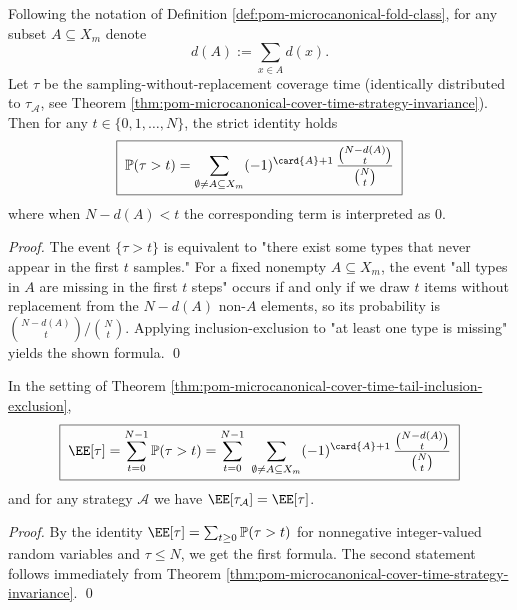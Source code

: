 \begin{theorem}\label{thm:pom-microcanonical-cover-time-tail-inclusion-exclusion}
Following the notation of Definition \ref{def:pom-microcanonical-fold-class}, for any subset \(A\subseteq X_m\) denote
\[
d(A):=\sum_{x\in A}d(x).
\]
Let \(\tau\) be the sampling-without-replacement coverage time (identically distributed to \(\tau_{\mathcal A}\), see Theorem \ref{thm:pom-microcanonical-cover-time-strategy-invariance}).
Then for any \(t\in\{0,1,\dots,N\}\), the strict identity holds
\[
\boxed{\;
\mathbb{P}(\tau>t)
=\sum_{\emptyset\neq A\subseteq X_m}(-1)^{\card{A}+1}\,
\frac{\binom{N-d(A)}{t}}{\binom{N}{t}}\;}
\]
where when \(N-d(A)<t\) the corresponding term is interpreted as \(0\).
\end{theorem}
\begin{proof}
The event \(\{\tau>t\}\) is equivalent to "there exist some types that never appear in the first \(t\) samples."
For a fixed nonempty \(A\subseteq X_m\), the event "all types in \(A\) are missing in the first \(t\) steps" occurs if and only if
we draw \(t\) items without replacement from the \(N-d(A)\) non-\(A\) elements, so its probability is \(\binom{N-d(A)}{t}/\binom{N}{t}\).
Applying inclusion-exclusion to "at least one type is missing" yields the shown formula. \qed
\end{proof}

\begin{corollary}\label{cor:pom-microcanonical-cover-time-mean}
In the setting of Theorem \ref{thm:pom-microcanonical-cover-time-tail-inclusion-exclusion},
\[
\boxed{\;
\EE[\tau]
=\sum_{t=0}^{N-1}\mathbb{P}(\tau>t)
=\sum_{t=0}^{N-1}\ \sum_{\emptyset\neq A\subseteq X_m}(-1)^{\card{A}+1}\,
\frac{\binom{N-d(A)}{t}}{\binom{N}{t}}\;}
\]
and for any strategy \(\mathcal A\) we have \(\EE[\tau_{\mathcal A}]=\EE[\tau]\).
\end{corollary}
\begin{proof}
By the identity \(\EE[\tau]=\sum_{t\ge 0}\mathbb{P}(\tau>t)\) for nonnegative integer-valued random variables and \(\tau\le N\), we get the first formula.
The second statement follows immediately from Theorem \ref{thm:pom-microcanonical-cover-time-strategy-invariance}. \qed
\end{proof}

